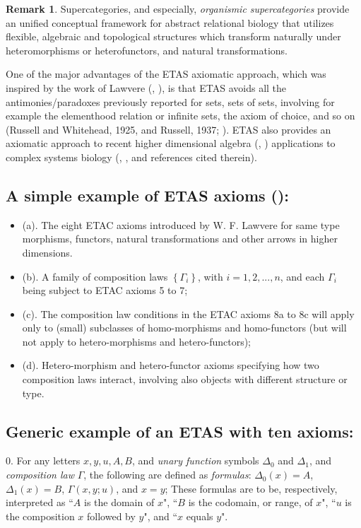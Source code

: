 \documentclass[12pt]{article}
\theoremstyle{plain}
\theoremstyle{definition}
\newtheorem{remark}{Remark}[section]
\numberwithin{equation}{section}
\begin{document}
\begin{remark}
 Supercategories, and especially, {\em organismic supercategories} provide an unified conceptual framework for abstract relational biology that utilizes flexible, algebraic and topological structures which transform naturally under heteromorphisms or heterofunctors, and natural transformations. 


 One of the major advantages of the ETAS axiomatic approach, which was inspired by the work of 
Lawvere (\cite{LW1}, \cite{LW2}), is that ETAS avoids all the antimonies/paradoxes previously reported for sets,
sets of sets, involving for example the elementhood relation or infinite sets, the axiom of choice, and so on (Russell and Whitehead, 1925, and Russell, 1937; \cite{BBGG1}). ETAS also provides an axiomatic approach to recent higher dimensional algebra (\cite{BHS2}, \cite{BGB2}) applications to complex systems biology 
(\cite{Bgg2}, \cite{BBGG1}, and references cited therein). 
\end{remark}

\subsection{A simple example of ETAS axioms (\cite{ICB3}):} 

\begin{itemize}
\item (a). The eight ETAC axioms introduced by W. F. Lawvere for same type morphisms, functors, natural transformations
and other arrows in higher dimensions. 
\item (b). A family of composition laws $\left\{\Gamma_i\right\}$, with $i= 1, 2, ..., n$, and
each $\Gamma_i$ being subject to ETAC axioms 5 to 7; 
\item (c). The composition law conditions in the ETAC axioms 8a to 8c will apply only to (small) subclasses of homo-morphisms and homo-functors (but will not apply to hetero-morphisms and hetero-functors); 
\item (d). Hetero-morphism and hetero-functor axioms specifying how two composition laws interact, involving also objects with different structure or type. 
\end{itemize}

\subsection{Generic example of an ETAS with ten axioms:}  


0. For any letters $x, y, u, A, B$, and \emph{unary function} symbols $\Delta_0$ and $\Delta_1$,
and \emph{composition law} $\Gamma$, the following are defined as \emph{formulas}: $\Delta_0 (x) = A$,
$\Delta_1 (x) = B$, $\Gamma (x,y;u)$, and $ x = y$; These formulas are to be, respectively, interpreted as
``$A$ is the domain of $x$", ``$B$ is the codomain, or range, of $x$", ``$u$ is the composition $x$ followed by $y$",
and ``$x$ equals $y$". 
\end{document}
